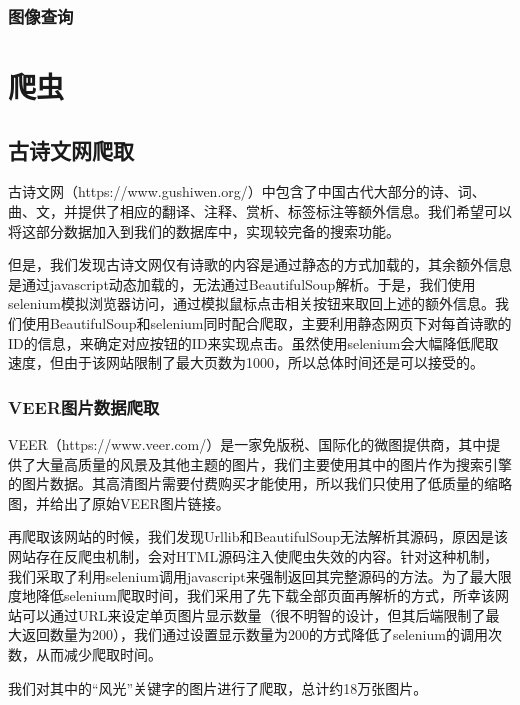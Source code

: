 \documentclass[a4paper, 10pt]{article}
\begin{document}
\subsubsection{图像查询}


\section{爬虫}
\subsection{古诗文网爬取}
古诗文网（https://www.gushiwen.org/）中包含了中国古代大部分的诗、词、曲、文，并提供了相应的翻译、注释、赏析、标签标注等额外信息。我们希望可以将这部分数据加入到我们的数据库中，实现较完备的搜索功能。

但是，我们发现古诗文网仅有诗歌的内容是通过静态的方式加载的，其余额外信息是通过javascript动态加载的，无法通过BeautifulSoup解析。于是，我们使用selenium模拟浏览器访问，通过模拟鼠标点击相关按钮来取回上述的额外信息。我们使用BeautifulSoup和selenium同时配合爬取，主要利用静态网页下对每首诗歌的ID的信息，来确定对应按钮的ID来实现点击。虽然使用selenium会大幅降低爬取速度，但由于该网站限制了最大页数为1000，所以总体时间还是可以接受的。

\subsubsection{VEER图片数据爬取}
VEER（https://www.veer.com/）是一家免版税、国际化的微图提供商，其中提供了大量高质量的风景及其他主题的图片，我们主要使用其中的图片作为搜索引擎的图片数据。其高清图片需要付费购买才能使用，所以我们只使用了低质量的缩略图，并给出了原始VEER图片链接。

再爬取该网站的时候，我们发现Urllib和BeautifulSoup无法解析其源码，原因是该网站存在反爬虫机制，会对HTML源码注入使爬虫失效的内容。针对这种机制，我们采取了利用selenium调用javascript来强制返回其完整源码的方法。为了最大限度地降低selenium爬取时间，我们采用了先下载全部页面再解析的方式，所幸该网站可以通过URL来设定单页图片显示数量（很不明智的设计，但其后端限制了最大返回数量为200），我们通过设置显示数量为200的方式降低了selenium的调用次数，从而减少爬取时间。

我们对其中的“风光”关键字的图片进行了爬取，总计约18万张图片。
\end{document}
